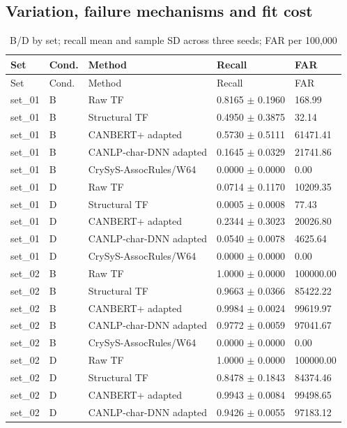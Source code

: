 \documentclass[12pt,a4paper,oneside,openany]{extbook}
\begin{document}
\subsection{Variation, failure mechanisms and fit cost}
\begin{longtable}{P{1.6cm}P{1.2cm}P{4.0cm}P{3.5cm}P{2.2cm}}
\caption{B/D by set; recall mean and sample SD across three seeds; FAR per 100,000}\label{tab:comparison-sets}\\\toprule
Set & Cond. & Method & Recall & FAR\\\midrule\endfirsthead
\toprule
Set & Cond. & Method & Recall & FAR\\\midrule\endhead
set\_01 & B & Raw TF & 0.8165 $\pm$ 0.1960 & 168.99\\
set\_01 & B & Structural TF & 0.4950 $\pm$ 0.3875 & 32.14\\
set\_01 & B & CANBERT+ adapted & 0.5730 $\pm$ 0.5111 & 61471.41\\
set\_01 & B & CANLP-char-DNN adapted & 0.1645 $\pm$ 0.0329 & 21741.86\\
set\_01 & B & CrySyS-AssocRules/W64 & 0.0000 $\pm$ 0.0000 & 0.00\\
set\_01 & D & Raw TF & 0.0714 $\pm$ 0.1170 & 10209.35\\
set\_01 & D & Structural TF & 0.0005 $\pm$ 0.0008 & 77.43\\
set\_01 & D & CANBERT+ adapted & 0.2344 $\pm$ 0.3023 & 20026.80\\
set\_01 & D & CANLP-char-DNN adapted & 0.0540 $\pm$ 0.0078 & 4625.64\\
set\_01 & D & CrySyS-AssocRules/W64 & 0.0000 $\pm$ 0.0000 & 0.00\\
set\_02 & B & Raw TF & 1.0000 $\pm$ 0.0000 & 100000.00\\
set\_02 & B & Structural TF & 0.9663 $\pm$ 0.0366 & 85422.22\\
set\_02 & B & CANBERT+ adapted & 0.9984 $\pm$ 0.0024 & 99619.97\\
set\_02 & B & CANLP-char-DNN adapted & 0.9772 $\pm$ 0.0059 & 97041.67\\
set\_02 & B & CrySyS-AssocRules/W64 & 0.0000 $\pm$ 0.0000 & 0.00\\
set\_02 & D & Raw TF & 1.0000 $\pm$ 0.0000 & 100000.00\\
set\_02 & D & Structural TF & 0.8478 $\pm$ 0.1843 & 84374.46\\
set\_02 & D & CANBERT+ adapted & 0.9943 $\pm$ 0.0084 & 99498.65\\
set\_02 & D & CANLP-char-DNN adapted & 0.9426 $\pm$ 0.0055 & 97183.12\\

\end{longtable}
\end{document}
